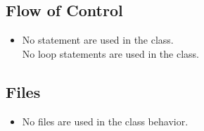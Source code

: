 \subsection{Flow of Control}
\begin{itemize}
	\item No  statement are used in the class.\\
	No loop statements are used in the class. 
\end{itemize}

\subsection{Files}
\begin{itemize}
	\item No files are used in the class behavior.
\end{itemize}
